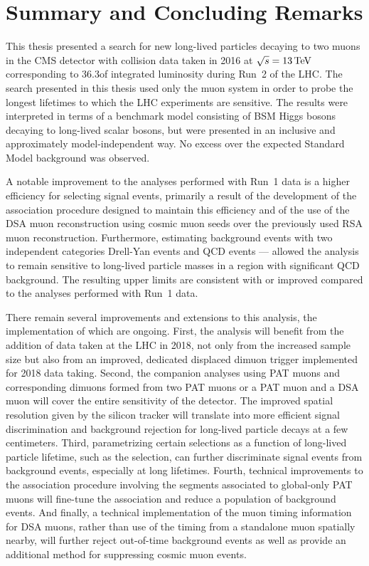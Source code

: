 \chapter{Summary and Concluding Remarks}
\label{chap:conclusion}

This thesis presented a search for new long-lived particles decaying to two muons in the CMS detector with \pp collision data taken in 2016 at $\sqrt{s} = 13\,\text{Te\hspace{-.08em}V}$ corresponding to 36.3\fbinv of integrated luminosity during Run~2 of the LHC.
The search presented in this thesis used only the muon system in order to probe the longest lifetimes to which the LHC experiments are sensitive.
The results were interpreted in terms of a benchmark model consisting of BSM Higgs bosons decaying to long-lived scalar bosons, but were presented in an inclusive and approximately model-independent way.
No excess over the expected Standard Model background was observed.

A notable improvement to the analyses performed with Run~1 data \cite{EXO-12-037,CMS-PAS-EXO-14-012} is a higher efficiency for selecting signal events, primarily a result of the development of the \DSAToPAT association procedure designed to maintain this efficiency and of the use of the DSA muon reconstruction using cosmic muon seeds over the previously used RSA muon reconstruction.
Furthermore, estimating background events with two independent categories Drell-Yan events and QCD events --- allowed the analysis to remain sensitive to long-lived particle masses in a region with significant QCD background.
The resulting upper limits are consistent with or improved compared to the analyses performed with Run~1 data.

There remain several improvements and extensions to this analysis, the implementation of which are ongoing.
First, the analysis will benefit from the addition of data taken at the LHC in 2018, not only from the increased sample size but also from an improved, dedicated displaced dimuon trigger implemented for 2018 data taking.
Second, the companion analyses using PAT muons and corresponding dimuons formed from two PAT muons or a PAT muon and a DSA muon will cover the entire sensitivity of the detector.
The improved spatial resolution given by the silicon tracker will translate into more efficient signal discrimination and background rejection for long-lived particle decays at a few centimeters.
Third, parametrizing certain selections as a function of long-lived particle lifetime, such as the \LxySig selection, can further discriminate signal events from background events, especially at long lifetimes.
Fourth, technical improvements to the \DSAToPAT association procedure involving the segments associated to global-only PAT muons will fine-tune the association and reduce a population of background events.
And finally, a technical implementation of the muon timing information for DSA muons, rather than use of the timing from a standalone muon spatially nearby, will further reject out-of-time background events as well as provide an additional method for suppressing cosmic muon events.

